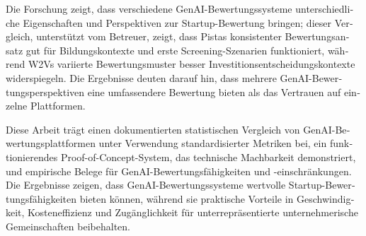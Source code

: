 \begin{otherlanguage}{ngerman}
Die Forschung zeigt, dass verschiedene GenAI-Bewertungssysteme unterschiedliche Eigenschaften und Perspektiven zur Startup-Bewertung bringen; dieser Vergleich, unterstützt vom Betreuer, zeigt, dass Pistas konsistenter Bewertungsansatz gut für Bildungskontexte und erste Screening-Szenarien funktioniert, während W2Vs variierte Bewertungsmuster besser Investitionsentscheidungskontexte widerspiegeln. Die Ergebnisse deuten darauf hin, dass mehrere GenAI-Bewertungsperspektiven eine umfassendere Bewertung bieten als das Vertrauen auf einzelne Plattformen.

Diese Arbeit trägt einen dokumentierten statistischen Vergleich von GenAI-Bewertungsplattformen unter Verwendung standardisierter Metriken bei, ein funktionierendes Proof-of-Concept-System, das technische Machbarkeit demonstriert, und empirische Belege für GenAI-Bewertungsfähigkeiten und -einschränkungen. Die Ergebnisse zeigen, dass GenAI-Bewertungssysteme wertvolle Startup-Bewertungsfähigkeiten bieten können, während sie praktische Vorteile in Geschwindigkeit, Kosteneffizienz und Zugänglichkeit für unterrepräsentierte unternehmerische Gemeinschaften beibehalten.

\end{otherlanguage}